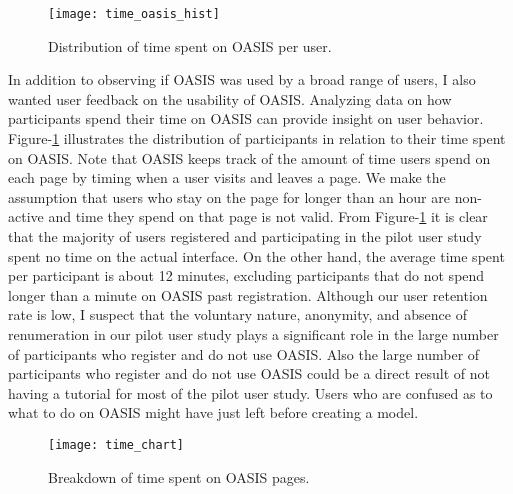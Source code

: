 \begin{figure}[!ht]
\centering
\texttt{[image: time\_oasis\_hist]}
\caption{Distribution of time spent on OASIS per user.}
\label{fig:time_oasis_hist}
\end{figure}

In addition to observing if OASIS was used by a broad range of users, I also wanted user feedback on the usability of OASIS.  Analyzing data on how participants spend their time  on OASIS can provide insight on user behavior.  Figure-\ref{fig:time_oasis_hist} illustrates the distribution of participants in relation to their time spent on OASIS.  Note that OASIS keeps track of the amount of time users spend on each page by timing when a user visits and leaves a page. We make the assumption that users who stay on the page for longer than an hour are non-active and time they spend on that page is not valid.  From Figure-\ref{fig:time_oasis_hist} it is clear that the majority of users registered and participating in the pilot user study spent no time on the actual interface.  On the other hand, the average time spent per participant is about 12 minutes, excluding participants that do not spend longer than a minute on OASIS past registration.  Although our user retention rate is low, I suspect that the voluntary nature, anonymity, and absence of renumeration in our pilot user study plays a significant role in the large number of participants who register and do not use OASIS.  Also  the large number of participants who register and do not use OASIS  could be a direct result of not having a tutorial for most of the pilot user study.  Users who are confused as to what to do on OASIS might have just left before creating a model.\\

\begin{figure}[!ht]
\centering
\texttt{[image: time\_chart]}
\caption{Breakdown of time spent on OASIS pages.}
\label{fig:time_chart}
\end{figure}


